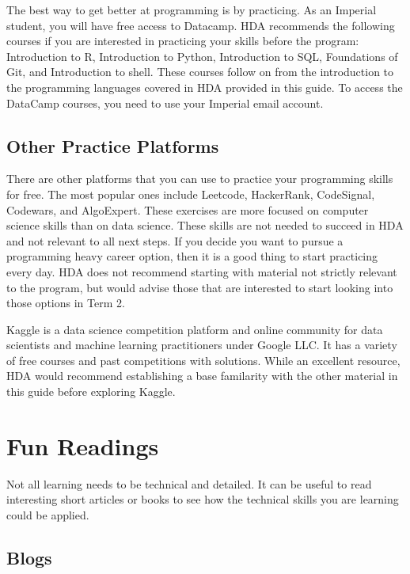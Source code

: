 \documentclass[
]{book}
\begin{document}
The best way to get better at programming is by practicing. As an Imperial student, you will have free access to Datacamp. HDA recommends the following courses if you are interested in practicing your skills before the program: Introduction to R, Introduction to Python, Introduction to SQL, Foundations of Git, and Introduction to shell. These courses follow on from the introduction to the programming languages covered in HDA provided in this guide. To access the DataCamp courses, you need to use your Imperial email account.

\subsection{Other Practice Platforms}\label{other-practice-platforms}

There are other platforms that you can use to practice your programming skills for free. The most popular ones include Leetcode, HackerRank, CodeSignal, Codewars, and AlgoExpert. These exercises are more focused on computer science skills than on data science. These skills are not needed to succeed in HDA and not relevant to all next steps. If you decide you want to pursue a programming heavy career option, then it is a good thing to start practicing every day. HDA does not recommend starting with material not strictly relevant to the program, but would advise those that are interested to start looking into those options in Term 2.

Kaggle is a data science competition platform and online community for data scientists and machine learning practitioners under Google LLC. It has a variety of free courses and past competitions with solutions. While an excellent resource, HDA would recommend establishing a base familarity with the other material in this guide before exploring Kaggle.

\section{Fun Readings}\label{fun-readings}

Not all learning needs to be technical and detailed. It can be useful to read interesting short articles or books to see how the technical skills you are learning could be applied.

\subsection{Blogs}\label{blogs}
\end{document}
